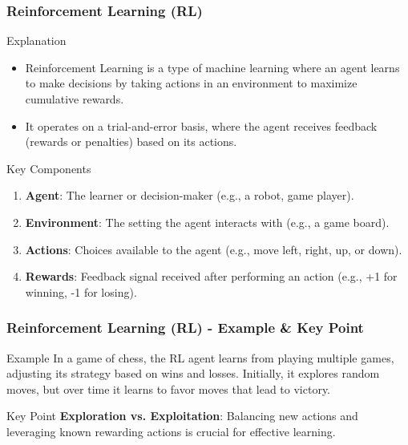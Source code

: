 \documentclass[aspectratio=169]{beamer}
\begin{document}
\begin{frame}[fragile]
    \frametitle{Reinforcement Learning (RL)}
    \begin{block}{Explanation}
        \begin{itemize}
            \item Reinforcement Learning is a type of machine learning where an agent learns to make decisions by taking actions in an environment to maximize cumulative rewards.
            \item It operates on a trial-and-error basis, where the agent receives feedback (rewards or penalties) based on its actions.
        \end{itemize}
    \end{block}
    
    \begin{block}{Key Components}
        \begin{enumerate}
            \item \textbf{Agent}: The learner or decision-maker (e.g., a robot, game player).
            \item \textbf{Environment}: The setting the agent interacts with (e.g., a game board).
            \item \textbf{Actions}: Choices available to the agent (e.g., move left, right, up, or down).
            \item \textbf{Rewards}: Feedback signal received after performing an action (e.g., +1 for winning, -1 for losing).
        \end{enumerate}
    \end{block}
\end{frame}

\begin{frame}[fragile]
    \frametitle{Reinforcement Learning (RL) - Example & Key Point}
    \begin{block}{Example}
        In a game of chess, the RL agent learns from playing multiple games, adjusting its strategy based on wins and losses. Initially, it explores random moves, but over time it learns to favor moves that lead to victory.
    \end{block}

    \begin{block}{Key Point}
        \textbf{Exploration vs. Exploitation}: Balancing new actions and leveraging known rewarding actions is crucial for effective learning.
    \end{block}
\end{frame}
\end{document}
